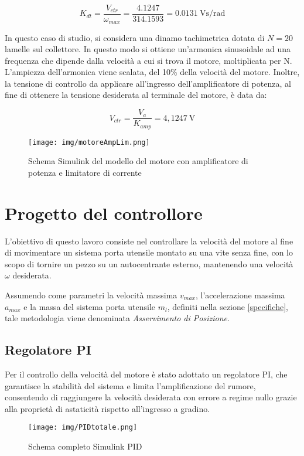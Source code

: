 \documentclass{article}
\begin{document}
\[
K_{dt} = \frac{V_{ctr}}{\omega_{max}} = \frac{4.1247}{314.1593} = 0.0131~\text{Vs/rad}
\]

In questo caso di studio, si considera una dinamo tachimetrica dotata di $N = 20$ lamelle sul collettore. In questo modo si ottiene un’armonica sinusoidale ad una frequenza che dipende dalla velocità a cui si trova il motore, moltiplicata per N. L’ampiezza dell’armonica viene scalata, del 10\% della velocità del motore.
Inoltre, la tensione di controllo da applicare all’ingresso dell’amplificatore di potenza, al fine di ottenere la tensione desiderata al terminale del motore, è data da:

\[
V_{ctr} = \frac{V_{a}}{K_{amp}} = 4{,}1247~\text{V}
\]

\begin{figure}[h!]
\texttt{[image: img/motoreAmpLim.png]}
\caption{Schema Simulink del modello del motore con amplificatore di potenza e limitatore di corrente}
\label{fig:model}
\end{figure}

\newpage

\section{Progetto del controllore}
L’obiettivo di questo lavoro consiste nel controllare la velocità del motore al fine di movimentare un sistema porta utensile montato su una vite senza fine, con lo scopo di tornire un pezzo su un autocentrante esterno, mantenendo una velocità $\omega$ desiderata.

Assumendo come parametri la velocità massima $v_{max}$, l’accelerazione massima $a_{max}$ e la massa del sistema porta utensile $m_l$, definiti nella sezione \ref{specifiche}, tale metodologia viene denominata \textit{Asservimento di Posizione}.


\subsection{Regolatore PI}
\label{specifiche2}
Per il controllo della velocità del motore è stato adottato un regolatore PI, che garantisce la stabilità del sistema e limita l’amplificazione del rumore, consentendo di raggiungere la velocità desiderata con errore a regime nullo grazie alla proprietà di astaticità rispetto all’ingresso a gradino.
\begin{figure}[h!]
    \centering
    \texttt{[image: img/PIDtotale.png]}
    \caption{Schema completo Simulink PID}
    \label{fig:enter-label}
\end{figure}
\end{document}
